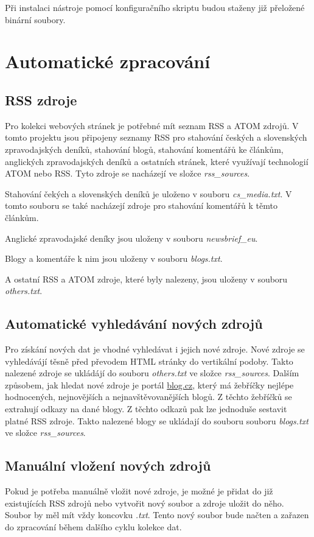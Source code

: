 Při instalaci nástroje pomocí konfiguračního skriptu budou staženy již přeložené binární
soubory.

\section{Automatické zpracování}

\subsection{RSS zdroje}
Pro kolekci webových stránek je potřebné mít seznam RSS a ATOM zdrojů. V tomto projektu
jsou připojeny seznamy RSS pro stahování českých a slovenských zpravodajských deníků, stahování blogů,
stahování komentářů ke článkům, anglických zpravodajských deníků a ostatních stránek, které využívají
technologií ATOM nebo RSS. Tyto zdroje se nacházejí ve složce \textit{rss\_sources}.

Stahování čekých a slovenských deníků je uloženo v souboru \textit{cs\_media.txt}. V tomto souboru
se také nacházejí zdroje pro stahování komentářů k těmto článkům.

Anglické zpravodajské deníky jsou uloženy v souboru \textit{newsbrief\_eu}.

Blogy a komentáře k nim jsou uloženy v souboru \textit{blogs.txt}.

A ostatní RSS a ATOM zdroje, které byly nalezeny, jsou uloženy v souboru \textit{others.txt}.

\subsection{Automatické vyhledávání nových zdrojů}
Pro získání nových dat je vhodné vyhledávat i jejich nové zdroje. Nové zdroje se vyhledávájí
těsně před převodem HTML stránky do vertikální podoby. Takto nalezené zdroje se ukládájí do souboru \textit{others.txt}
ve složce \textit{rss\_sources}.
Dalším způsobem, jak hledat nové zdroje je portál \href{http://blog.cz/}{blog.cz}, který má žebříčky
nejlépe hodnocených, nejnovějších a nejnavštěvovanějších blogů. Z těchto žebříčků se extrahují odkazy
na dané blogy. Z těchto odkazů pak lze jednoduše sestavit platné RSS zdroje. Takto nalezené blogy
se ukládají do souboru souboru \textit{blogs.txt} ve složce \textit{rss\_sources}.

\subsection{Manuální vložení nových zdrojů}
Pokud je potřeba manuálně vložit nové zdroje, je možné je přidat do již existujících
RSS zdrojů nebo vytvořit nový soubor a zdroje uložit do něho. Soubor by měl mít vždy koncovku
\textit{.txt}. Tento nový soubor bude načten a zařazen do zpracování během dalšího cyklu kolekce dat.


